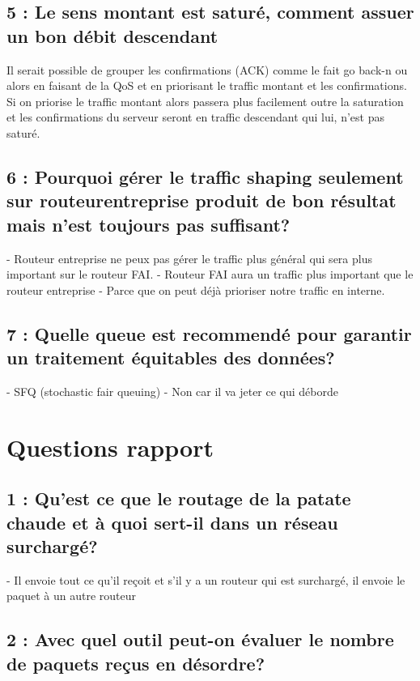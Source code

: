 \documentclass{article}
\begin{document}
\subsection*{5 : Le sens montant est saturé, comment assuer un bon débit descendant}

Il serait possible de grouper les confirmations (ACK) comme le fait go back-n\cite{GoBackN} ou alors en faisant de la QoS et en priorisant le traffic montant et les confirmations.\\

Si on priorise le traffic montant alors passera plus facilement outre la saturation et les confirmations du serveur seront en traffic descendant qui lui, n'est pas saturé.


\subsection*{6 : Pourquoi gérer le traffic shaping seulement sur routeurentreprise produit de bon résultat mais n'est toujours pas suffisant?}

- Routeur entreprise ne peux pas gérer le traffic plus général qui sera plus important sur le routeur FAI.
- Routeur FAI aura un traffic plus important que le routeur entreprise
- Parce que on peut déjà prioriser notre traffic en interne.

\subsection*{7 : Quelle queue est recommendé pour garantir un traitement équitables des données?}

- SFQ (stochastic fair queuing)
- Non car il va jeter ce qui déborde

\section{Questions rapport}

\subsection*{1 : Qu'est ce que le routage de la patate chaude et à quoi sert-il dans un réseau surchargé?}

- Il envoie tout ce qu'il reçoit et s'il y a un routeur qui est surchargé, il envoie le paquet à un autre routeur

\subsection*{2 : Avec quel outil peut-on évaluer le nombre de paquets reçus en désordre?}
\end{document}
